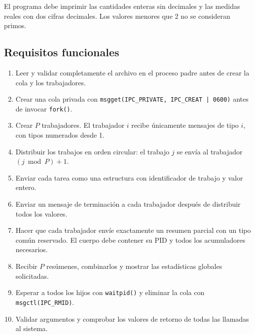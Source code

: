 \documentclass[12pt,a4paper]{article}
\begin{document}
El programa debe imprimir las cantidades enteras sin decimales y las medidas reales con dos cifras decimales. Los valores menores que 2 no se consideran primos.

\subsection*{Requisitos funcionales}

\begin{enumerate}[itemsep=0.35em]
    \item Leer y validar completamente el archivo en el proceso padre antes de crear la cola y los trabajadores.
    \item Crear una cola privada con \texttt{msgget(IPC\_PRIVATE, IPC\_CREAT | 0600)} antes de invocar \texttt{fork()}.
    \item Crear $P$ trabajadores. El trabajador $i$ recibe únicamente mensajes de tipo $i$, con tipos numerados desde 1.
    \item Distribuir los trabajos en orden circular: el trabajo $j$ se envía al trabajador $(j \bmod P) + 1$.
    \item Enviar cada tarea como una estructura con identificador de trabajo y valor entero.
    \item Enviar un mensaje de terminación a cada trabajador después de distribuir todos los valores.
    \item Hacer que cada trabajador envíe exactamente un resumen parcial con un tipo común reservado. El cuerpo debe contener su PID y todos los acumuladores necesarios.
    \item Recibir $P$ resúmenes, combinarlos y mostrar las estadísticas globales solicitadas.
    \item Esperar a todos los hijos con \texttt{waitpid()} y eliminar la cola con \texttt{msgctl(IPC\_RMID)}.
    \item Validar argumentos y comprobar los valores de retorno de todas las llamadas al sistema.
\end{enumerate}
\end{document}
